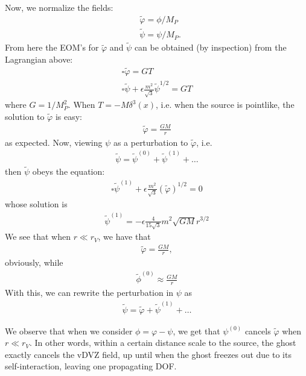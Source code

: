 \documentclass{book}
\theoremstyle{definition}
\newcommand{\nn}{\nonumber}
\newcommand{\f}[2]{\frac{#1}{#2}}
\begin{document}
\begin{framed}
	Now, we normalize the fields:
	\begin{align}
	&\tilde\varphi = \phi/M_P\\
	&\tilde\psi = \psi/M_P.
	\end{align}
	From here the EOM's for $\tilde\varphi$ and $\tilde\psi$ can be obtained (by inspection) from the Lagrangian above:
	\begin{align}
	\square \tilde\varphi = GT \nn\\
	\square\tilde\psi + \epsilon \f{m^2}{\sqrt{3}}\tilde\psi^{1/2} = GT
	\end{align}	
	where $G = 1/M_P^2$. When $T = -M \delta^3(x)$, i.e. when the source is pointlike, the solution to $\tilde\varphi$ is easy:
	\begin{align}
	\boxed{\tilde\varphi = \f{GM}{r}}
	\end{align} 
	as expected. Now, viewing $\psi$ as a perturbation to $\tilde\varphi$, i.e.
	\begin{align}
	\tilde\psi = \tilde\psi^{(0)} + \tilde\psi^{(1)} + \dots
	\end{align}
	then $\tilde\psi$ obeys the equation:
	\begin{align}
	\boxed{\square \tilde\psi^{(1)} + \epsilon \f{m^2}{\sqrt{3}} (\tilde{\varphi})^{1/2} = 0 }
	\end{align}
	whose solution is
	\begin{align}
	\boxed{\tilde\psi^{(1)} = -\epsilon \f{4}{15\sqrt{3}} m^2 \sqrt{GM} r^{3/2} }
	\end{align}
	We see that when $r \ll r_V$, we have that
	\begin{align}
	\tilde\varphi = \f{GM}{r},
	\end{align}
	obviously, while
	\begin{align}
	\tilde\phi^{(0)} \approx \f{GM}{r}
	\end{align}
	With this, we can rewrite the perturbation in $\psi$ as
	\begin{align}
	\tilde\psi = \tilde\varphi + \tilde\psi^{(1)} + \dots
	\end{align}
	
	
	We observe that when we consider $\phi = \varphi - \psi$, we get that $\psi^{(0)}$ cancels $\tilde\varphi$ when $r \ll r_V$. In other words, within
	a certain distance scale to the source, the ghost exactly
	cancels the vDVZ field, up until when the ghost freezes out
	due to its self-interaction, leaving one propagating DOF.\\ 
	
	
		

\end{framed}
\end{document}
